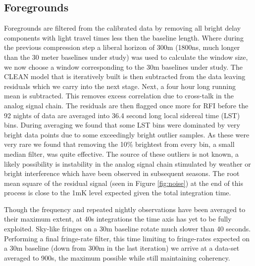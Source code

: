 \documentclass[preprint]{aastex}
\begin{document}
\subsection{Foregrounds}
Foregrounds are filtered from the calibrated data by removing all bright delay components with light travel times less then the baseline length. Where during the previous compression step a liberal horizon of 300m (1800ns, much longer than the 30 meter baselines under study)  was used to calculate the window size, we now choose a window corresponding to the 30m baselines under study.  The CLEAN model that is iteratively built is then subtracted from the data leaving residuals which we carry into the next stage. Next, a four hour long running mean is subtracted. This removes excess correlation due to cross-talk in the analog signal chain. The residuals are then flagged once more for RFI before the 92 nights of data are averaged into 36.4 second long local sidereal time (LST) bins.  During averaging we found that some LST bins were dominated by very bright data points due to some exceedingly bright outlier samples. As these were very rare we found that removing the 10\% brightest from every bin, a small median filter, was quite effective.  The source of these outliers is not known,  a likely possibility is instability in the analog signal chain stimulated by weather or bright interference which have been observed in subsequent seasons.  The root mean square of the residual signal (seen in Figure \ref{fig:noise}) at the end of this process is close to the 1mK level expected given the total integration time.  

Though the frequency and repeated nightly observations have been averaged to their maximum extent, at 40s integrations the time axis has yet to be fully exploited.  Sky-like fringes on a 30m baseline rotate much slower than 40 seconds.  Performing a final fringe-rate filter, this time limiting to fringe-rates expected on a 30m baseline (down from 300m in the last iteration) we arrive at a data-set averaged to 900s, the maximum possible while still maintaining coherency. 


\end{document}
